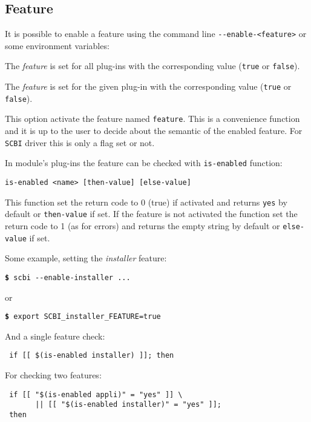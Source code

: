 \documentclass[a4paper,12pt,twoside]{article}
\newcommand{\code}[1]{\texttt{#1}}
\renewcommand{\emph}[1]{\textit{#1}}
\newcommand{\cmd}[1]{\tabto{1cm}\hspace{0.5cm}\texttt{\textbf{\$} #1}}
\newcommand{\ddash}{-{}-}
\begin{document}
\subsection{Feature}
\label{enable-feature}

It is possible to enable a feature using the command line \code{\ddash{}enable-<feature>} or some environment variables:

\begin{description}[style=nextline]
	\item [SCBI\_<feature>\_FEATURE] The \emph{feature} is set for all plug-ins with the corresponding value (\code{true} or \code{false}).
	\item [SCBI\_<plugin>\_<feature>\_FEATURE] The \emph{feature} is set for the given plug-in with the corresponding value (\code{true} or \code{false}).
\end{description}

This option activate the feature named \code{feature}. This is a convenience function and it is up to the user to decide about the semantic of the enabled feature. For \code{SCBI} driver this is only a flag set or not.

In module's plug-ins the feature can be checked with \code{is-enabled} function:

\code{is-enabled <name> [then-value] [else-value]}

This function set the return code to 0 (true) if activated and returns \code{yes} by default or \code{then-value} if set. If the feature is not activated the function set the return code to 1 (as for errors) and returns the empty string by default or \code{else-value} if set.

Some example, setting the \emph{installer} feature:

\cmd{scbi \ddash{}enable-installer ...}

or

\cmd{export SCBI\_installer\_FEATURE=true}

And a single feature check:

\begin{lstlisting}
 if [[ $(is-enabled installer) ]]; then
\end{lstlisting}

For checking two features:

\begin{lstlisting}
 if [[ "$(is-enabled appli)" = "yes" ]] \
       || [[ "$(is-enabled installer)" = "yes" ]];
 then
\end{lstlisting}
\end{document}
